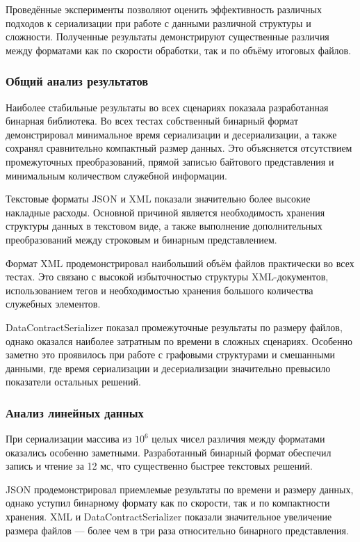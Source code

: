 \documentclass[coursework]{SCWorks}
\begin{document}
Проведённые эксперименты позволяют оценить эффективность различных подходов к сериализации при работе с данными различной структуры и сложности. Полученные результаты демонстрируют существенные различия между форматами как по скорости обработки, так и по объёму итоговых файлов.

\subsubsection{Общий анализ результатов}

Наиболее стабильные результаты во всех сценариях показала разработанная бинарная библиотека. Во всех тестах собственный бинарный формат демонстрировал минимальное время сериализации и десериализации, а также сохранял сравнительно компактный размер данных. Это объясняется отсутствием промежуточных преобразований, прямой записью байтового представления и минимальным количеством служебной информации.

Текстовые форматы JSON и XML показали значительно более высокие накладные расходы. Основной причиной является необходимость хранения структуры данных в текстовом виде, а также выполнение дополнительных преобразований между строковым и бинарным представлением.

Формат XML продемонстрировал наибольший объём файлов практически во всех тестах. Это связано с высокой избыточностью структуры XML-документов, использованием тегов и необходимостью хранения большого количества служебных элементов.

DataContractSerializer показал промежуточные результаты по размеру файлов, однако оказался наиболее затратным по времени в сложных сценариях. Особенно заметно это проявилось при работе с графовыми структурами и смешанными данными, где время сериализации и десериализации значительно превысило показатели остальных решений.

\subsubsection{Анализ линейных данных}

При сериализации массива из $10^6$ целых чисел различия между форматами оказались особенно заметными. Разработанный бинарный формат обеспечил запись и чтение за 12 мс, что существенно быстрее текстовых решений.

JSON продемонстрировал приемлемые результаты по времени и размеру данных, однако уступил бинарному формату как по скорости, так и по компактности хранения. XML и DataContractSerializer показали значительное увеличение размера файлов — более чем в три раза относительно бинарного представления.
\end{document}
